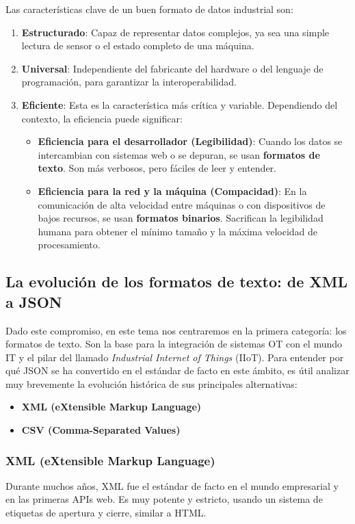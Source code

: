 Las características clave de un buen formato de datos industrial son:
\begin{enumerate}
\item \textbf{Estructurado}: Capaz de representar datos complejos, ya sea una simple lectura de sensor o el estado completo de una máquina.
\item \textbf{Universal}: Independiente del fabricante del hardware o del lenguaje de programación, para garantizar la interoperabilidad.
\item \textbf{Eficiente}: Esta es la característica más crítica y variable. Dependiendo del contexto, la eficiencia puede significar:
\begin{itemize}
\item \textbf{Eficiencia para el desarrollador (Legibilidad)}: Cuando los datos se intercambian con sistemas web o se depuran, se usan \textbf{formatos de texto}. Son más verbosos, pero fáciles de leer y entender.
\item \textbf{Eficiencia para la red y la máquina (Compacidad)}: En la comunicación de alta velocidad entre máquinas o con dispositivos de bajos recursos, se usan \textbf{formatos binarios}. Sacrifican la legibilidad humana para obtener el mínimo tamaño y la máxima velocidad de procesamiento.
\end{itemize}
\end{enumerate}

\subsection{La evolución de los formatos de texto: de XML a JSON}
Dado este compromiso, en este tema nos centraremos en la primera categoría: los formatos de texto. Son la base para la integración de sistemas OT con el mundo IT y el pilar del llamado \textit{Industrial Internet of Things} (IIoT). Para entender por qué JSON se ha convertido en el estándar de facto en este ámbito, es útil analizar muy brevemente la evolución histórica de sus principales alternativas:

\begin{itemize}
  \item \textbf{XML (eXtensible Markup Language)}
  \item \textbf{CSV (Comma-Separated Values)}
\end{itemize}
\newpage
\subsubsection*{XML (eXtensible Markup Language)}
Durante muchos años, XML fue el estándar de facto en el mundo empresarial y en las primeras APIs web. Es muy potente y estricto, usando un sistema de etiquetas de apertura y cierre, similar a HTML.

